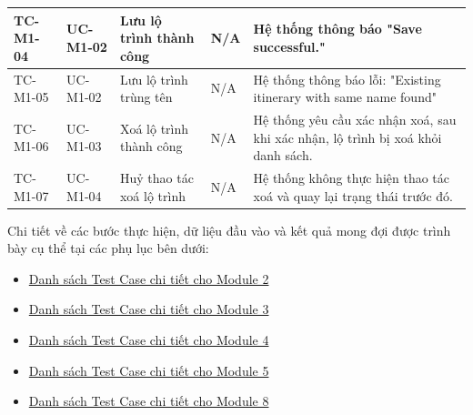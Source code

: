 \begin{landscape}
\begin{longtable}{|p{2.2cm}|p{2.2cm}|p{4cm}|p{4.5cm}|p{6cm}|}
TC-M1-04 & UC-M1-02 & Lưu lộ trình thành công & 
N/A & 
Hệ thống thông báo "Save successful."  \\
\hline

TC-M1-05 & UC-M1-02 & Lưu lộ trình trùng tên& 
N/A & 
Hệ thống thông báo lỗi: "Existing itinerary with same name found"  \\
\hline

TC-M1-06 & UC-M1-03 & Xoá lộ trình thành công & 
N/A & 
Hệ thống yêu cầu xác nhận xoá, sau khi xác nhận, lộ trình bị xoá khỏi danh sách.  \\
\hline

TC-M1-07 & UC-M1-04 & Huỷ thao tác xoá lộ trình & 
N/A & 
Hệ thống không thực hiện thao tác xoá và quay lại trạng thái trước đó.  \\
\hline


\end{longtable}
\end{landscape}
Chi tiết về các bước thực hiện, dữ liệu đầu vào và kết quả mong đợi được trình bày cụ thể tại các phụ lục bên dưới:
\begin{itemize}
    \item \hyperlink{target:tc_m2}{Danh sách Test Case chi tiết cho Module 2}
    \item \hyperlink{target:tc_m3}{Danh sách Test Case chi tiết cho Module 3}
    \item \hyperlink{target:tc_m4}{Danh sách Test Case chi tiết cho Module 4}
    \item \hyperlink{target:tc_m5}{Danh sách Test Case chi tiết cho Module 5}
    \item   \hyperlink{target:tc_m8}{Danh sách Test Case chi tiết cho Module 8}
\end{itemize}
